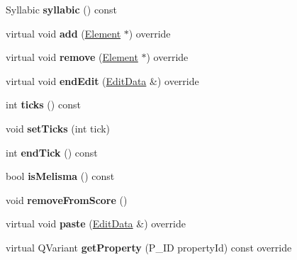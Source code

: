 \begin{DoxyCompactItemize}
Syllabic {\bfseries syllabic} () const
\item 
\mbox{\label{class_ms_1_1_lyrics_a3d3c3c52a2e91687e063564e60af4cc7}} 
virtual void {\bfseries add} (\hyperlink{class_ms_1_1_element}{Element} $\ast$) override
\item 
\mbox{\label{class_ms_1_1_lyrics_abbef3d68238db0fbf71cc32a86346d05}} 
virtual void {\bfseries remove} (\hyperlink{class_ms_1_1_element}{Element} $\ast$) override
\item 
\mbox{\label{class_ms_1_1_lyrics_a9fbf7d868befb2a94a8366e1fcd61c3a}} 
virtual void {\bfseries end\+Edit} (\hyperlink{class_ms_1_1_edit_data}{Edit\+Data} \&) override
\item 
\mbox{\label{class_ms_1_1_lyrics_ae2a298b39a699855893e1ee4589a72ac}} 
int {\bfseries ticks} () const
\item 
\mbox{\label{class_ms_1_1_lyrics_a53b3aefa004a7e67919118f94fd808f7}} 
void {\bfseries set\+Ticks} (int tick)
\item 
\mbox{\label{class_ms_1_1_lyrics_a8a02b7d9413bf162cb01dc1da77c8d74}} 
int {\bfseries end\+Tick} () const
\item 
\mbox{\label{class_ms_1_1_lyrics_abe669b92dbfad70fe7b70fec58629ab0}} 
bool {\bfseries is\+Melisma} () const
\item 
\mbox{\label{class_ms_1_1_lyrics_a061a9cf9c6b35438bdfca3f1b54b98be}} 
void {\bfseries remove\+From\+Score} ()
\item 
\mbox{\label{class_ms_1_1_lyrics_abc9fa7cdeb3a301fa7bc39d74dc3b84d}} 
virtual void {\bfseries paste} (\hyperlink{class_ms_1_1_edit_data}{Edit\+Data} \&) override
\item 
\mbox{\label{class_ms_1_1_lyrics_a4c61d4224341509a11090345edd4ab92}} 
virtual Q\+Variant {\bfseries get\+Property} (P\+\_\+\+ID property\+Id) const override
\item 
\mbox{\label{class_ms_1_1_lyrics_a01a4d50dd728332dd605454d9bc43a54}} 

\end{DoxyCompactItemize}
